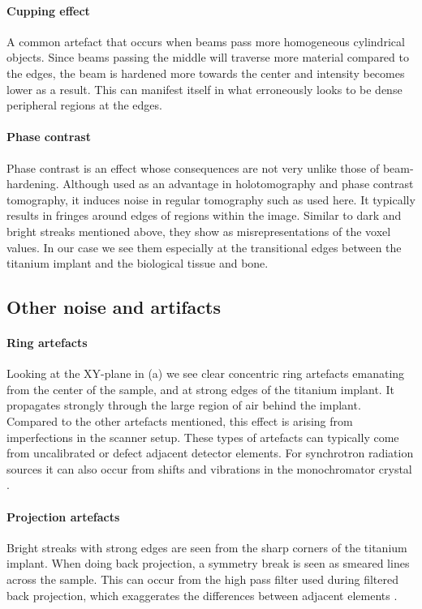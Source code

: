\documentclass[pdflatex,sn-mathphys]{sn-jnl}%
\theoremstyle{thmstyleone}%
\theoremstyle{thmstyletwo}%
\theoremstyle{thmstylethree}%
\begin{document}
\paragraph{Cupping effect} A common artefact that occurs when beams pass more homogeneous
cylindrical objects. Since beams passing the middle will traverse more material compared to the
edges, the beam is hardened more towards the center and intensity becomes lower as a result. This
can manifest itself in what erroneously looks to be dense peripheral regions at the edges.

\paragraph{Phase contrast} Phase contrast is an effect whose consequences are not very unlike those
of beam-hardening.  Although used as an advantage in holotomography\citep{holotomography} and phase
contrast tomography\citep{phasecontrast}, it induces noise in regular tomography such as used here.
It typically results in fringes around edges of regions within the image\citep{srnoise}. Similar to
dark and bright streaks mentioned above, they show as misrepresentations of the voxel values. In our
case we see them especially at the transitional edges between the titanium implant and the
biological tissue and bone.

\subsection{Other noise and artifacts}
\label{sec:noise-artefacts}

\paragraph{Ring artefacts} Looking at the XY-plane in (a) we see clear concentric ring
artefacts emanating from the center of the sample, and at strong edges of the titanium implant. It
propagates strongly through the large region of air behind the implant. Compared to the other
artefacts mentioned, this effect is arising from imperfections in the scanner setup. These types of
artefacts can typically come from uncalibrated or defect adjacent detector elements. For synchrotron
radiation sources it can also occur from shifts and vibrations in the monochromator crystal
\citep{ringartefacts}.

\paragraph{Projection artefacts} Bright streaks with strong edges are seen from the sharp corners of
the titanium implant. When doing back projection, a symmetry break is seen as smeared lines across
the sample. This can occur from the high pass filter used during filtered back projection, which
exaggerates the differences between adjacent elements \citep{ctnoise}.
\end{document}
